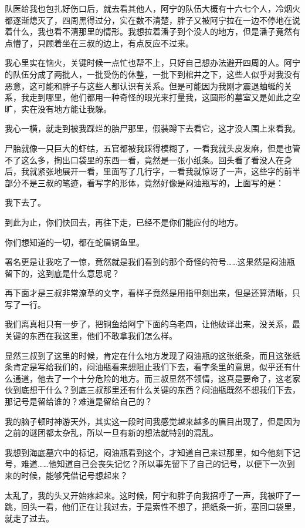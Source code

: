 队医给我也包扎好伤口后，就去看其他人，阿宁的队伍大概有十六七个人，冷烟火都逐渐熄灭了，四周黑得过分，实在数不清楚，胖子又被阿宁拉在一边不停地在说着什么，我也看不清那里的情形。我想拉着潘子到个没人的地方，但是潘子竟然有点懵了，只顾着坐在三叔的边上，有点反应不过来。

我心里实在恼火，关键时候一点忙也帮不上，只好自己想办法避开四周的人。阿宁的队伍分成了两批人，一批受伤的休整，一批下到棺井之下，这些人似乎对我没有恶意，这可能和胖子与这些人都认识有关系。但是可能因为我刚才震退蚰蜒的关系，我走到哪里，他们都用一种奇怪的眼光来打量我，这圆形的墓室又是如此之空旷，实在没有地方能让我躲。

我心一横，就走到被我踩烂的胎尸那里，假装蹲下去看它，这才没人围上来看我。

尸胎就像一只巨大的虾蛄，五官都被我踩得模糊了，一看我就头皮发麻，但是也管不了这么多，掏出口袋里的东西一看，竟然是一张小纸条。回头看了看没人在身后，我就紧张地展开一看，里面写了几行字，一看我就惊讶了一声，这些字的前半部分不是三叔的笔迹，看写字的形体，竟然好像是闷油瓶写的，上面写的是：

我下去了。

到此为止，你们快回去，再往下走，已经不是你们能应付的地方。

你们想知道的一切，都在蛇眉铜鱼里。

署名更是让我吃了一惊，竟然就是我们看到的那个奇怪的符号……这果然是闷油瓶留下的，这到底是什么意思呢？

再下面才是三叔非常潦草的文字，看样子竟然是用指甲刻出来，但是还算清晰，只写了一行。

我们离真相只有一步了，把铜鱼给阿宁下面的乌老四，让他破译出来，没关系，最关键的东西在我这里，他们不敢拿我们怎么样。

显然三叔到了这里的时候，肯定在什么地方发现了闷油瓶的这张纸条，而且这张纸条肯定是写给我们的，闷油瓶看来想阻止我们下去，看字条里的意思，似乎还有什么通道，他去了一个十分危险的地方。而三叔显然不领情，这真是要命了，这老家伙到底想干什么？到底三叔那里还有什么关键的东西？闷油瓶既然不想我们下去，那记号是留给谁的？难道是留给自己的？

我的脑子顿时神游天外，其实这一段时间我感觉越来越多的眉目出现了，但是因为之前的谜团都太杂乱，所以一旦有新的想法就特别的混乱。

我想到海底墓穴中的标记，闷油瓶看到这个，才知道自己来过那里，如今他刻下记号，难道……他知道自己会丧失记忆？所以事先留下了自己的记号，以便下一次到来的时候，能够凭借记号想起来？

太乱了，我的头又开始疼起来。这时候，阿宁和胖子向我招呼了一声，我被吓了一跳，回头一看，他们正在让我过去，于是索性不想了，把纸条一折，塞回口袋里，就走了过去。

